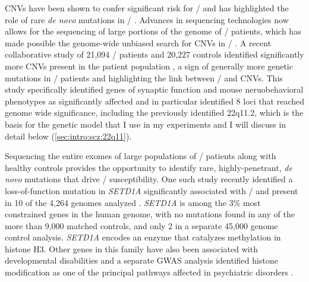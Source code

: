 \ac{CNVs} have been shown to confer significant risk for \scz/ and has highlighted the role of rare \emph{de novo} mutations in \scz/ \citep{Rodriguez-Murillo2012}.
Advances in sequencing technologies now allows for the sequencing of large portions of the genome of \scz/ patients, which has made possible the genome-wide unbiased search for \ac{CNVs} in \scz/ \citep{Xu2011}.
A recent collaborative study of 21,094 \scz/ patients and 20,227 controls identified significantly more \ac{CNVs} present in the patient population \citep{Marshall2016}, a sign of generally more genetic mutations in \scz/ patients and highlighting the link between \scz/ and \ac{CNVs}.
This study specifically identified genes of synaptic function and mouse neruobehavioral phenotypes as significantly affected and in particular identified 8 loci that reached genome wide significance, including the previously identified 22q11.2, which is the basis for the genetic model that I use in my experiments and I will discuss in detail below (\autoref{sec:intro:scz:22q11}).


Sequencing the entire exomes of large populations of \scz/ patients along with healthy controls provides the opportunity to identify rare, highly-penetrant, \emph{de novo} mutations that drive \scz/ susceptibility. One such study recently identified a loss-of-function mutation in \emph{SETD1A} significantly associated with \scz/ and present in 10 of the 4,264 genomes analyzed \citep{Singh2016}.
\emph{SETD1A} is among the 3\% most constrained genes in the human genome, with no mutations found in any of the more than 9,000 matched controls, and only 2 in a separate 45,000 genome control analysis.
\emph{SETD1A} encodes an enzyme that catalyzes methylation in histone H3. Other genes in this family have also been associated with developmental disabilities and a separate GWAS analysis identified histone modification as one of the principal pathways affected in psychiatric disorders \citep{ODushlaine2015}.

